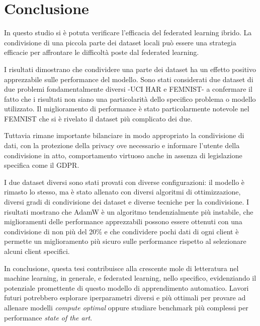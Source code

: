 \chapter{Conclusione}
In questo studio si è potuta verificare l'efficacia del 
federated learning ibrido. La condivisione di una piccola parte dei 
dataset locali può essere una strategia efficacie per affrontare le 
difficoltà poste dal federated learning.

I risultati dimostrano che condividere una parte dei dataset ha un 
effetto positivo apprezzabile sulle performance del modello. Sono stati 
considerati due dataset di due problemi fondamentalmente diversi -UCI HAR 
e FEMNIST- a confermare il fatto che i risultati non siano una particolarità
dello specifico problema o modello utilizzato. Il miglioramento di 
performance è stato particolarmente notevole nel FEMNIST che si è rivelato 
il dataset più complicato dei due. 

Tuttavia rimane importante bilanciare in modo appropriato la condivisione 
di dati, con la protezione della privacy ove necessario e informare 
l'utente della condivisione in atto, comportamento virtuoso anche in 
assenza di legislazione specifica come il GDPR.

I due dataset diversi sono stati provati con diverse configurazioni: il 
modello è rimasto lo stesso, ma è stato allenato con diversi algoritmi
di ottimizzazione, diversi gradi di condivisione dei dataset e diverse 
tecniche per la condivisione. I risultati mostrano che AdamW è un 
algoritmo tendenzialmente più instabile, che miglioramenti delle 
performance apprezzabili possono essere ottenuti con una condivisione 
di non più del 20\% e che condividere pochi dati di ogni client è 
permette un miglioramento più sicuro sulle performance rispetto al 
selezionare alcuni client specifici.

In conclusione, questa tesi contribuisce alla crescente mole di letteratura
nel machine learning, in generale, e federated learning, nello specifico, 
evidenziando il potenziale promettente di questo modello di apprendimento
automatico. Lavori futuri potrebbero esplorare iperparametri diversi e più
ottimali per provare ad allenare modelli \textit{compute optimal} oppure 
studiare benchmark più complessi per performance \textit{state of the art}.
